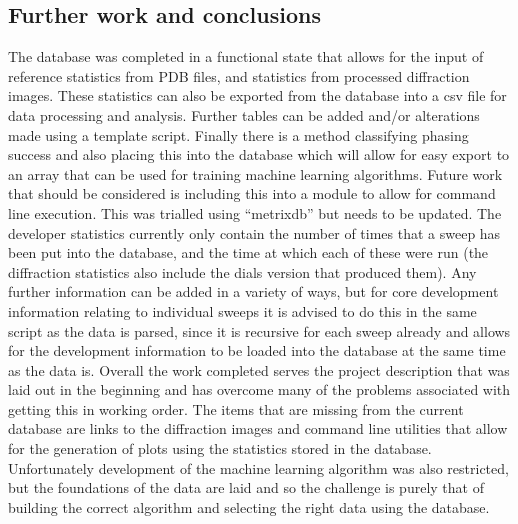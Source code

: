 \documentclass[11pt, a4paper]{article}
\begin{document}
\begin{multicols}{2}
\section{Further work and conclusions}
The database was completed in a functional state that allows for the input of reference statistics from PDB files, and statistics from processed diffraction images. These statistics can also be exported from the database into a csv file for data processing and analysis. Further tables can be added and/or alterations made using a template script. Finally there is a method classifying phasing success and also placing this into the database which will allow for easy export to an array that can be used for training machine learning algorithms. Future work that should be considered is including this into a module to allow for command line execution. This was trialled using ``metrixdb'' but needs to be updated. The developer statistics currently only contain the number of times that a sweep has been put into the database, and the time at which each of these were run (the diffraction statistics also include the dials version that produced them). Any further information can be added in a variety of ways, but for core development information relating to individual sweeps it is advised to do this in the same script as the data is parsed, since it is recursive for each sweep already and allows for the development information to be loaded into the database at the same time as the data is. Overall the work completed serves the project description that was laid out in the beginning and has overcome many of the problems associated with getting this in working order. The items that are missing from the current database are links to the diffraction images and command line utilities that allow for the generation of plots using the statistics stored in the database. Unfortunately development of the machine learning algorithm was also restricted, but the foundations of the data are laid and so the challenge is purely that of building the correct algorithm and selecting the right data using the database. 
\end{multicols}
\newpage
\end{document}
